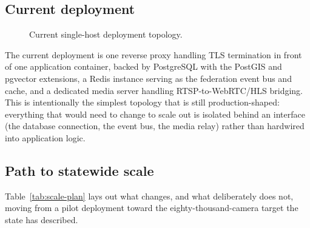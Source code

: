 \documentclass[11pt,a4paper]{article}
\begin{document}
\subsection{Current deployment}

\begin{figure}[h]
\centering

\caption{Current single-host deployment topology.}
\label{fig:deployment}
\end{figure}

The current deployment is one reverse proxy handling TLS termination in
front of one application container, backed by PostgreSQL with the PostGIS
and pgvector extensions, a Redis instance serving as the federation event
bus and cache, and a dedicated media server handling RTSP-to-WebRTC/HLS
bridging. This is intentionally the simplest topology that is still
production-shaped: everything that would need to change to scale out is
isolated behind an interface (the database connection, the event bus,
the media relay) rather than hardwired into application logic.

\subsection{Path to statewide scale}

Table~\ref{tab:scale-plan} lays out what changes, and what deliberately
does not, moving from a pilot deployment toward the eighty-thousand-camera
target the state has described.
\end{document}
